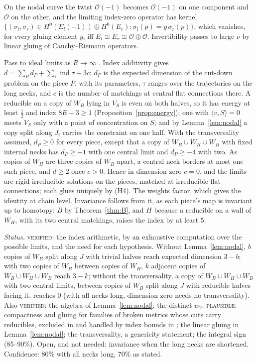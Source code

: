 \documentclass[10pt]{amsart}
\makeatletter
\numberwithin{equation}{section}
\theoremstyle{compact}
\renewenvironment{proof}[1][\proofname]{\par\pushQED{\qed}\normalfont
  \topsep4\p@\relax\trivlist\item[\hskip\labelsep\itshape#1\@addpunct{.}]%
  \ignorespaces}{\popQED\endtrivlist\@endpefalse}
\newcommand{\cO}{\mathcal O}
\newcommand{\step}[1]{\par\noindent\textit{#1}\enspace}
\newcommand{\ver}{\textsc{verified}}
\newcommand{\pla}{\textsc{plausible}}
\makeatother
\begin{document}
\begin{proof}
On the nodal curve the twist $\cO(-1)$ becomes $\cO(-1)$ on one component and
$\cO$ on the other, and the limiting index-zero operator has kernel
$\{(\sigma_l,\sigma_r)\in H^0(E_l(-1))\oplus H^0(E_r):\sigma_l(p)=g\,\sigma_r(p)\}$,
which vanishes, for every gluing element $g$, iff $E_l\cong E_r\cong\cO\oplus\cO$.
Invertibility passes to large $\nu$ by linear gluing of Cauchy--Riemann
operators.
\end{proof}

\begin{proof}[Sketch of proof of Theorem~\ref{thm:glue}]
Pass to ideal limits as $R\to\infty$ \cite[\S3.9]{KM11}. Index additivity gives
$d=\sum_Pd_P+\sum_\tau\operatorname{ind}\tau+3c$: $d_P$ is the expected dimension
of the cut-down problem on the piece $P$, with its parameters, $\tau$ ranges over
the trajectories on the long necks, and $c$ is the number of matchings at
central flat connections there. A reducible on a copy of $W_B$ lying in $V_S$ is
even on both halves, so it has energy at least $\frac12$ and index $8E-3\ge1$
(Proposition~\ref{prop:energy}); one with $\langle v,S\rangle=0$ meets $V_S$ only
with a point of concentration on $S$; and by Lemma~\ref{lem:nodal} a copy split
along $J_i$ carries the constraint on one half. With the transversality
assumed, $d_P\ge0$ for every piece, except that a copy of $W_B\cup W_H\cup W_B$
with fixed internal necks has $d_P\ge-1$ with one central limit and $d_P\ge-4$
with two. As copies of $W_H$ are three copies of $W_B$ apart, a central neck
borders at most one such piece, and $d\ge2$ once $c>0$. Hence in dimension zero
$c=0$, and the limits are rigid irreducible solutions on the pieces, matched at
irreducible flat connections; each glues uniquely by (H4). The weights factor,
which gives the identity at chain level. Invariance follows from it, as each
piece's map is invariant up to homotopy: $B$ by Theorem~\ref{thm:B}, and $H$
because a reducible on a wall of $W_H$, with its two central matchings, raises
the index by at least $5$.
\end{proof}

\step{Status.} \ver: the index arithmetic, by an exhaustive computation over the
possible limits, and the need for each hypothesis. Without
Lemma~\ref{lem:nodal}, $b$ copies of $W_B$ split along $J$ with trivial halves
reach expected dimension $3-b$; with two copies of $W_B$ between copies of
$W_H$, $k$ adjacent copies of $W_B\cup W_H\cup W_B$ reach $3-k$; without the
transversality, a copy of $W_B\cup W_H\cup W_B$ with two central limits, between
copies of $W_B$ split along $J$ with reducible halves facing it, reaches $0$
(with all necks long, dimension zero needs no transversality). Also \ver: the
algebra of Lemma~\ref{lem:nodal}; the distinct $w_2$. \pla: compactness and
gluing for families of broken metrics whose cuts carry reducibles, excluded in
\cite[\S3.9]{KM11} and handled by index bounds in \cite[\S5]{DLME}; the linear
gluing in Lemma~\ref{lem:nodal}; the transversality, a genericity statement; the
integral sign (85--90\%). Open, and not needed: invariance when the long necks
are shortened. Confidence: 80\% with all necks long, 70\% as stated.
\end{document}
